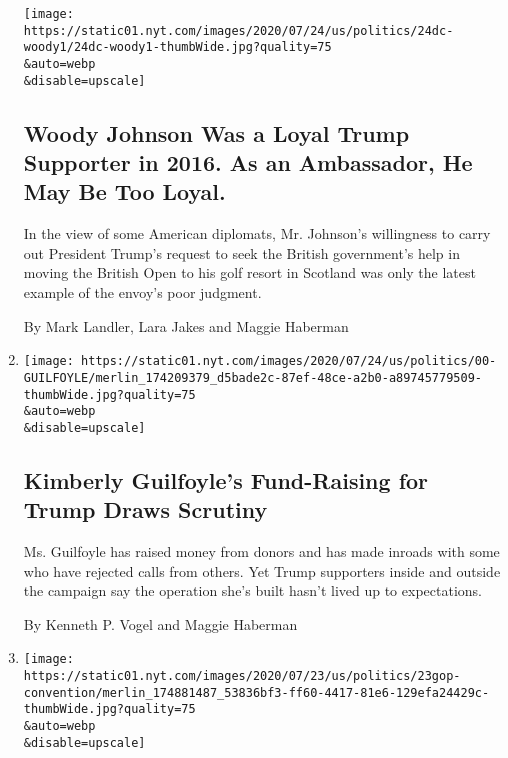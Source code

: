 \begin{enumerate}
  \texttt{[image: https://static01.nyt.com/images/2020/07/24/us/politics/24dc-woody1/24dc-woody1-thumbWide.jpg?quality=75\\\&auto=webp\\\&disable=upscale]}

  \hypertarget{woody-johnson-was-a-loyal-trump-supporter-in-2016-as-an-ambassador-he-may-be-too-loyal}{%
  \subsection{Woody Johnson Was a Loyal Trump Supporter in 2016. As an
  Ambassador, He May Be Too
  Loyal.}\label{woody-johnson-was-a-loyal-trump-supporter-in-2016-as-an-ambassador-he-may-be-too-loyal}}

  In the view of some American diplomats, Mr. Johnson's willingness to
  carry out President Trump's request to seek the British government's
  help in moving the British Open to his golf resort in Scotland was
  only the latest example of the envoy's poor judgment.

  By Mark Landler, Lara Jakes and Maggie Haberman
\item
  \href{/2020/07/24/us/politics/kimberly-guilfoyles-trump-fundraising.html}{}

  \texttt{[image: https://static01.nyt.com/images/2020/07/24/us/politics/00-GUILFOYLE/merlin\_174209379\_d5bade2c-87ef-48ce-a2b0-a89745779509-thumbWide.jpg?quality=75\\\&auto=webp\\\&disable=upscale]}

  \hypertarget{kimberly-guilfoyles-fund-raising-for-trump-draws-scrutiny}{%
  \subsection{Kimberly Guilfoyle's Fund-Raising for Trump Draws
  Scrutiny}\label{kimberly-guilfoyles-fund-raising-for-trump-draws-scrutiny}}

  Ms. Guilfoyle has raised money from donors and has made inroads with
  some who have rejected calls from others. Yet Trump supporters inside
  and outside the campaign say the operation she's built hasn't lived up
  to expectations.

  By Kenneth P. Vogel and Maggie Haberman
\item
  \href{/2020/07/23/us/politics/jacksonville-rnc.html}{}

  \texttt{[image: https://static01.nyt.com/images/2020/07/23/us/politics/23gop-convention/merlin\_174881487\_53836bf3-ff60-4417-81e6-129efa24429c-thumbWide.jpg?quality=75\\\&auto=webp\\\&disable=upscale]}

  \hypertarget{trump-abruptly-cancels-republican-convention-in-florida-its-not-the-right-time}{%
}
\end{enumerate}
